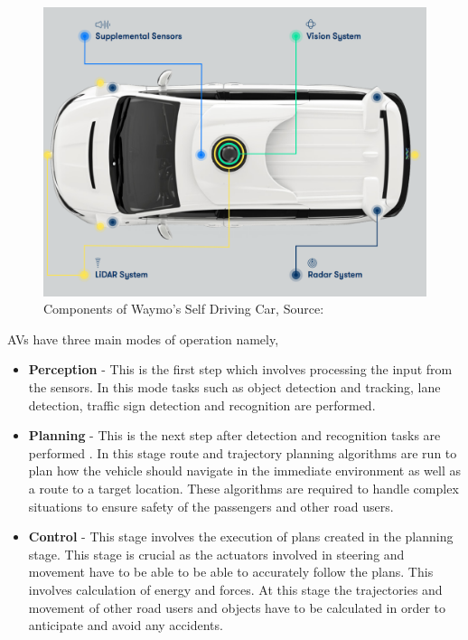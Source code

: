 \begin{figure}[t]
	\centering
	\includegraphics[width=\textwidth]{media/waymo.png}
	\caption{Components of Waymo's Self Driving Car, Source:\cite{waymo_2018}}
	\label{fig:my_label}
\end{figure}


AVs have three main modes of operation namely,
\begin{itemize}
	\item \textbf{Perception} - This is the first step which involves processing the input from the sensors. In this mode tasks such as object detection and tracking, lane detection, traffic sign detection and recognition are performed.
	\item \textbf{Planning} - This is the next step after detection and recognition tasks are performed . In this stage route and trajectory planning algorithms are run  to plan how the vehicle should navigate in the immediate environment as well as a route to a target location. These algorithms are required to handle complex situations to ensure safety of the passengers and other road users. 
	\item \textbf{Control} - This stage involves the execution of plans created in the planning stage. This stage is crucial as the actuators involved in steering and movement have to be able to be able to accurately follow the plans. This involves calculation of energy and forces. At this stage the trajectories and movement of other road users and objects have to be calculated in order to anticipate and avoid any accidents. 
	
\end{itemize}



